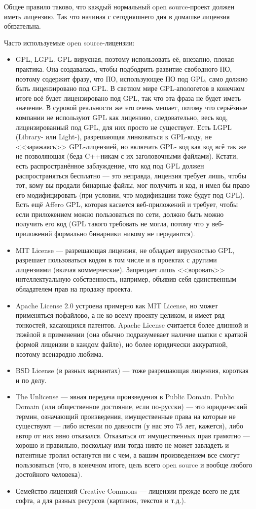 \documentclass[a5paper]{article}
\begin{document}
Общее правило таково, что каждый нормальный open source-проект должен иметь лицензию. Так что начиная с сегодняшнего дня в домашке лицензия обязательна.

Часто используемые open source-лицензии:

\begin{itemize}
    \item GPL, LGPL. GPL вирусная, поэтому использовать её, внезапно, плохая практика. Она создавалась, чтобы подбодрить развитие свободного ПО, поэтому содержит фразу, что ПО, использующее ПО под GPL, само должно быть лицензировано под GPL. В светлом мире GPL-апологетов в конечном итоге всё будет лицензировано под GPL, так что эта фраза не будет иметь значение. В суровой реальности же это очень мешает, потому что серьёзные компании не используют GPL как лицензию, следовательно, весь код, лицензированный под GPL, для них просто не существует. Есть LGPL (Library- или Light-), разрешающая линковаться к GPL-коду, не <<заражаясь>> GPL-лицензией, но включать GPL- код как код всё так же не позволяющая (беда C++никам с их заголовочными файлами). Кстати, есть распространённое заблуждение, что код под GPL должен распространяться бесплатно --- это неправда, лицензия требует лишь, чтобы тот, кому вы продали бинарные файлы, мог получить и код, и имел бы право его модифицировать (при условии, что модификации тоже будут под GPL). Есть ещё Affero GPL, которая касается веб-приложений и требует, чтобы если приложением можно пользоваться по сети, должно быть можно получить его код (GPL такого требовать не могла, потому что у веб-приложений формально бинарники никому не передаются).
    \item MIT License --- разрешающая лицензия, не обладает вирусностью GPL, разрешает пользоваться кодом в том числе и в проектах с другими лицензиями (вклчая коммерческие). Запрещает лишь <<воровать>> интеллектуальную собственность, например, объявив себя единственным обладателем прав на продажу проекта.
    \item Apache License 2.0 устроена примерно как MIT License, но может применяться пофайлово, а не ко всему проекту целиком, и имеет ряд тонкостей, касающихся патентов. Apache License считается более длинной и тяжёлой в применении (она обычно подразумевает наличие шапки с краткой формой лицензии в каждом файле), но более юридически аккуратной, поэтому всенародно любима.
    \item BSD License (в разных вариантах) --- тоже разрешающая лицензия, короткая и по делу.
    \item The Unlicense --- явная передача произведения в Public Domain. Public Domain (или общественное достояние, если по-русски) --- это юридический термин, означающий произведения, имущественные права на которые не существуют --- либо истекли по давности (у нас это 75 лет, кажется), либо автор от них явно отказался. Отказаться от имущественных прав грамотно --- хорошо и правильно, поскольку ими тогда никто не может завладеть и патентные тролил останутся ни с чем, а вашим произведением все смогут пользоваться (что, в конечном итоге, цель всего open source и вообще любого достойного человека).
    \item Семейство лицензий Creative Commons --- лицензии прежде всего не для софта, а для разных ресурсов (картинок, текстов и т.д.).
\end{itemize}
\end{document}
